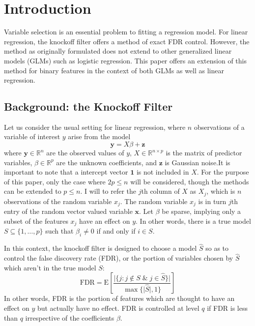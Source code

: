 \documentclass[11pt]{article}
\newcommand{\R}{\mathbb{R}}
\newcommand{\E}{\mathrm{E}}
\theoremstyle{definition}
\begin{document}
\newpage


\section{Introduction}
Variable selection is an essential problem to fitting a regression model. For linear regression, the knockoff filter \cite{2014arXiv1404.5609F} offers a method of exact FDR control. However, the method as originally formulated does not extend to other generalized linear models (GLMs) such as logistic regression. This paper offers an extension of this method for binary features in the context of both GLMs as well as linear regression.
    
\subsection{Background: the Knockoff Filter}
    Let us consider the usual setting for linear regression, where $n$ observations of a variable of interest $y$ arise from the model
    \[\mathbf{y} = X\beta + \mathbf{z}\]
    where $\mathbf{y}\in\R^n$ are the observed values of $y$, $X \in \R^{n\times p}$ is the matrix of predictor variables, $\beta\in\R^p$ are the unknown coefficients, and $\mathbf z$ is Gaussian noise.It is important to note that a intercept vector $\mathbf 1$ is not included in $X$. For the purpose of this paper, only the case where $2p\leq n$ will be considered, though the methods can be extended to $p\leq n$. I will to refer the $j$th column of $X$ as $X_j$, which is $n$ observations of the random variable $x_j$. The random variable $x_j$ is in turn $j$th entry of the random vector valued variable $\mathbf x$. Let $\beta$ be sparse, implying only a subset of the features $x_j$ have an effect on  $y$. In other words, there is a true model $S\subseteq \{1,\ldots,p\}$ such that $\beta_i\neq0$ if and only if $i\in S$. \par
     In this context, the knockoff filter is designed to choose a model $\hat S$ so as to control the false discovery rate (FDR), or the portion of variables chosen by $\hat S$ which aren't in the true model $S$:
    \[ \textrm{FDR} = \E\left[\frac{\vert{\{j: j\not\in S \; \& \; j\in\hat S\}}\vert}{\max\{\vert{\hat S}\vert,1\}} \right] \]
    In other words, FDR is the portion of features which are thought to have an effect on $y$ but actually have no effect. FDR is controlled at level $q$ if FDR is less than $q$ irrespective of the coefficients $\beta$. \par
\end{document}
